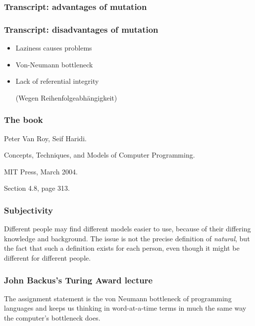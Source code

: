 \documentclass{beamer}
\begin{document}
\begin{frame}
\frametitle{Transcript: advantages of mutation}
\end{frame}

\begin{frame}
\frametitle{Transcript: disadvantages of mutation}
\begin{itemize}
\pause
\item Laziness causes problems
\pause
\item Von-Neumann bottleneck
\pause
\item Lack of referential integrity

(Wegen Reihenfolgeabhängigkeit)
\end{itemize}
\end{frame}

\begin{frame}
\frametitle{The book}
Peter Van Roy, Seif Haridi.

Concepts, Techniques, and Models of Computer Programming.

MIT Press, March 2004.

Section 4.8, page 313.
\end{frame}

\begin{frame}
\frametitle{Subjectivity}
Different people may find different models easier to use, because of
their differing knowledge and background. The issue is not the precise
definition of \emph{natural}, but the fact that such a definition
exists for each person, even though it might be different for
different people.
\end{frame}

\begin{frame}
\frametitle{John Backus's Turing Award lecture}
The assignment statement is the von Neumann bottleneck of programming
languages and keeps us thinking in word-at-a-time terms in much the
same way the computer's bottleneck does.
\end{frame}
\end{document}
